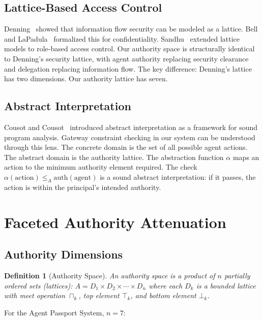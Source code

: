 \documentclass[sigconf,nonacm]{acmart}
\newtheorem{definition}{Definition}
\begin{document}
\subsection{Lattice-Based Access Control}

Denning~\cite{denning1976} showed that information flow security can be modeled as a
lattice. Bell and LaPadula~\cite{bell1973} formalized this for confidentiality.
Sandhu~\cite{sandhu1993} extended lattice models to role-based access control. Our
authority space is structurally identical to Denning's security lattice, with agent
authority replacing security clearance and delegation replacing information flow. The
key difference: Denning's lattice has two dimensions. Our authority lattice has seven.

\subsection{Abstract Interpretation}

Cousot and Cousot~\cite{cousot1977} introduced abstract interpretation as a framework
for sound program analysis. Gateway constraint checking in our system can be understood
through this lens. The concrete domain is the set of all possible agent actions. The
abstract domain is the authority lattice. The abstraction function $\alpha$ maps an
action to the minimum authority element required. The check
$\alpha(\text{action}) \leq_A \text{auth}(\text{agent})$ is a sound abstract
interpretation: if it passes, the action is within the principal's intended authority.

\section{Faceted Authority Attenuation}

\subsection{Authority Dimensions}

\begin{definition}[Authority Space]
An authority space is a product of $n$ partially ordered sets (lattices):
$A = D_1 \times D_2 \times \cdots \times D_n$
where each $D_k$ is a bounded lattice with meet operation $\sqcap_k$,
top element $\top_k$, and bottom element $\bot_k$.
\end{definition}

For the Agent Passport System, $n = 7$:
\end{document}
